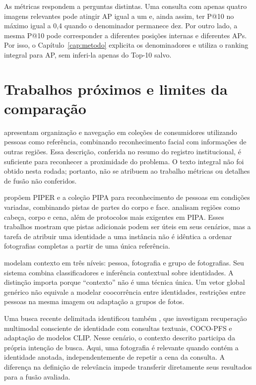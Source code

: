 As métricas respondem a perguntas distintas. Uma consulta com apenas quatro imagens relevantes pode atingir AP igual a um e, ainda assim, ter P@10 no máximo igual a 0,4 quando o denominador permanece dez. Por outro lado, a mesma P@10 pode corresponder a diferentes posições internas e diferentes APs. Por isso, o Capítulo~\ref{cap:metodo} explicita os denominadores e utiliza o ranking integral para AP, sem inferi-la apenas do Top-10 salvo.

\section{Trabalhos próximos e limites da comparação}
 apresentam organização e navegação em coleções de consumidores utilizando pessoas como referência, combinando reconhecimento facial com informações de outras regiões. Essa descrição, conferida no resumo do registro institucional, é suficiente para reconhecer a proximidade do problema. O texto integral não foi obtido nesta rodada; portanto, não se atribuem ao trabalho métricas ou detalhes de fusão não conferidos.

 propõem PIPER e a coleção PIPA para reconhecimento de pessoas em condições variadas, combinando pistas de partes do corpo e face.  analisam regiões como cabeça, corpo e cena, além de protocolos mais exigentes em PIPA. Esses trabalhos mostram que pistas adicionais podem ser úteis em seus cenários, mas a tarefa de atribuir uma identidade a uma instância não é idêntica a ordenar fotografias completas a partir de uma única referência.

 modelam contexto em três níveis: pessoa, fotografia e grupo de fotografias. Seu sistema combina classificadores e inferência contextual sobre identidades. A distinção importa porque ``contexto'' não é uma técnica única. Um vetor global genérico não equivale a modelar coocorrência entre identidades, restrições entre pessoas na mesma imagem ou adaptação a grupos de fotos.

Uma busca recente delimitada identificou também , que investigam recuperação multimodal consciente de identidade com consultas textuais, COCO-PFS e adaptação de modelos CLIP. Nesse cenário, o contexto descrito participa da própria intenção de busca. Aqui, uma fotografia é relevante quando contém a identidade anotada, independentemente de repetir a cena da consulta. A diferença na definição de relevância impede transferir diretamente seus resultados para a fusão avaliada.

